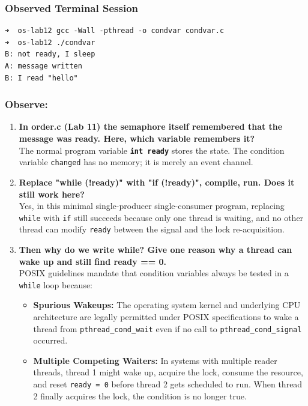 \documentclass{labreport}
\begin{document}
\subsubsection{Observed Terminal Session}
\begin{lstlisting}[style=bash]
➜  os-lab12 gcc -Wall -pthread -o condvar condvar.c
➜  os-lab12 ./condvar
B: not ready, I sleep
A: message written
B: I read "hello"
\end{lstlisting}

\subsubsection*{Observe:}
\begin{enumerate}[leftmargin=*]
    \item \textbf{In order.c (Lab 11) the semaphore itself remembered that the message was ready. Here, which variable remembers it?}\\[0.2em]
    The normal program variable \textbf{\texttt{int ready}} stores the state. The condition variable \texttt{changed} has no memory; it is merely an event channel.

    \item \textbf{Replace "while (!ready)" with "if (!ready)", compile, run. Does it still work here?}\\[0.2em]
    Yes, in this minimal single-producer single-consumer program, replacing \texttt{while} with \texttt{if} still succeeds because only one thread is waiting, and no other thread can modify \texttt{ready} between the signal and the lock re-acquisition.

    \item \textbf{Then why do we write while? Give one reason why a thread can wake up and still find ready == 0.}\\[0.2em]
    POSIX guidelines mandate that condition variables always be tested in a \texttt{while} loop because:
    \begin{itemize}[noitemsep]
        \item \textbf{Spurious Wakeups:} The operating system kernel and underlying CPU architecture are legally permitted under POSIX specifications to wake a thread from \texttt{pthread\_cond\_wait} even if no call to \texttt{pthread\_cond\_signal} occurred.
        \item \textbf{Multiple Competing Waiters:} In systems with multiple reader threads, thread 1 might wake up, acquire the lock, consume the resource, and reset \texttt{ready = 0} before thread 2 gets scheduled to run. When thread 2 finally acquires the lock, the condition is no longer true.
    \end{itemize}
\end{enumerate}
\end{document}
